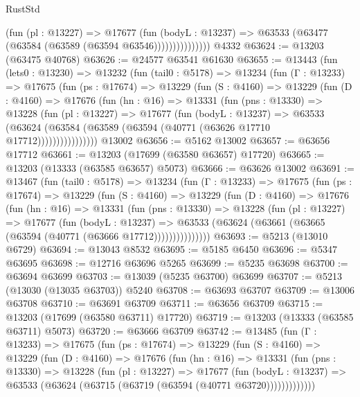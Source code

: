 \begin{lexlean}{RustStd}
\begin{coremodule}
                      (fun (pl : @13227) =>
                      @17677
                        (fun (bodyL : @13237) =>
                        @63533 (@63477 (@63584 (@63589 (@63594 @63546)))))))))))))))
    @4332
@63624 := @13203 (@63475 @40768)
@63626 := @24577 @63541 @61630
@63655 := @13443
    (fun (lets0 : @13230) =>
    @13232
      (fun (tail0 : @5178) =>
      @13234
        (fun (Γ : @13233) =>
        @17675
          (fun (ps : @17674) =>
          @13229
            (fun (S : @4160) =>
            @13229
              (fun (D : @4160) =>
              @17676
                (fun (hn : @16) =>
                @13331
                  (fun (pns : @13330) =>
                  @13228
                    (fun (pl : @13227) =>
                    @17677
                      (fun (bodyL : @13237) =>
                      @63533
                        (@63624
                          (@63584 (@63589 (@63594 (@40771 (@63626 @17710 @17712))))))))))))))))
    @13002
@63656 := @5162 @13002
@63657 := @63656 @17712
@63661 := @13203 (@17699 (@63580 @63657) @17720)
@63665 := @13203 (@13333 (@63585 @63657) @5073)
@63666 := @63626 @13002
@63691 := @13467
    (fun (tail0 : @5178) =>
    @13234
      (fun (Γ : @13233) =>
      @17675
        (fun (ps : @17674) =>
        @13229
          (fun (S : @4160) =>
          @13229
            (fun (D : @4160) =>
            @17676
              (fun (hn : @16) =>
              @13331
                (fun (pns : @13330) =>
                @13228
                  (fun (pl : @13227) =>
                  @17677
                    (fun (bodyL : @13237) =>
                    @63533 (@63624 (@63661 (@63665 (@63594 (@40771 (@63666 @17712)))))))))))))))
@63693 := @5213 (@13010 @6729)
@63694 := @13043 @8532
@63695 := @5185 @6450
@63696 := @5347 @63695
@63698 := @12716 @63696 @5265
@63699 := @5235 @63698
@63700 := @63694 @63699
@63703 := @13039 (@5235 @63700) @63699
@63707 := @5213 (@13030 (@13035 @63703)) @5240
@63708 := @63693 @63707
@63709 := @13006 @63708
@63710 := @63691 @63709
@63711 := @63656 @63709
@63715 := @13203 (@17699 (@63580 @63711) @17720)
@63719 := @13203 (@13333 (@63585 @63711) @5073)
@63720 := @63666 @63709
@63742 := @13485
    (fun (Γ : @13233) =>
    @17675
      (fun (ps : @17674) =>
      @13229
        (fun (S : @4160) =>
        @13229
          (fun (D : @4160) =>
          @17676
            (fun (hn : @16) =>
            @13331
              (fun (pns : @13330) =>
              @13228
                (fun (pl : @13227) =>
                @17677
                  (fun (bodyL : @13237) =>
                  @63533 (@63624 (@63715 (@63719 (@63594 (@40771 @63720)))))))))))))

\end{coremodule}
\end{lexlean}
